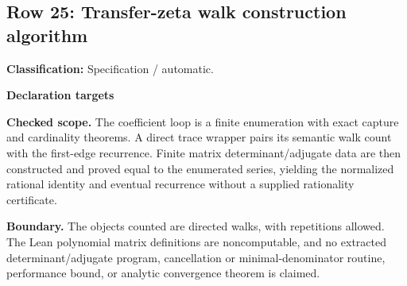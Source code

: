 \subsection{Row 25: Transfer-zeta walk construction algorithm}
\label{row:25}
\textbf{Classification:} Specification / automatic.
\par\smallskip\textbf{Declaration targets}\par
{\small\noindent{}\par}
{\small\noindent{}\par}
{\small\noindent{}\par}
{\small\noindent{}\par}
{\small\noindent{}\par}
{\small\noindent{}\par}
{\small\noindent{}\par}
{\small\noindent{}\par}
{\small\noindent{}\par}
{\small\noindent{}\par}
{\small\noindent{}\par}
{\small\noindent{}\par}
{\small\noindent{}\par}
{\small\noindent{}\par}
\smallskip\textbf{Checked scope.} The coefficient loop is a finite  enumeration with exact capture and cardinality theorems. A direct trace wrapper pairs its semantic walk count with the first-edge recurrence. Finite matrix determinant/adjugate data are then constructed and proved equal to the enumerated series, yielding the normalized rational identity and eventual recurrence without a supplied rationality certificate.
\par\smallskip\textbf{Boundary.} The objects counted are directed walks, with repetitions allowed. The Lean polynomial matrix definitions are noncomputable, and no extracted determinant/adjugate program, cancellation or minimal-denominator routine, performance bound, or analytic convergence theorem is claimed.
\medskip
